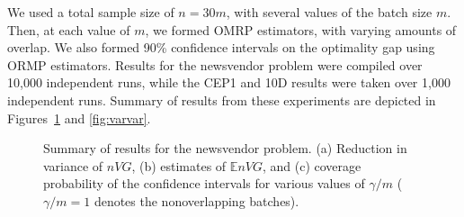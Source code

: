 \documentclass{article}
\newcommand{\e}[1]{\mathbb{E} %
#1 %
}
\begin{document}
We used a total sample size of $n = 30 m$, with several values of the batch size $m$. 
Then, at each value of $m$, we formed OMRP estimators, with varying amounts of overlap. 
We also formed 90\% confidence intervals on the optimality gap using ORMP estimators. 
Results for the newsvendor problem were compiled over 10,000 independent runs, while the CEP1 and 10D results were taken over 1,000 independent runs.  
Summary of results from these experiments are depicted in Figures~\ref{fig:nv} and \ref{fig:varvar}.

\begin{figure}[htb!]
	\centering
	\caption{
		Summary of results for the newsvendor problem. 
		(a) Reduction in variance of $nVG$,
		(b) estimates of $\e{nVG}$, and 
		(c) coverage probability of the confidence intervals for various values of $\gamma/m$ ($\gamma/m=1$ denotes the nonoverlapping batches).
	}
\label{fig:nv}
\end{figure}
\end{document}
